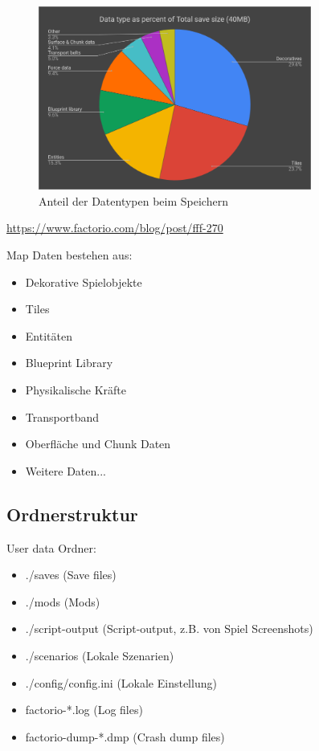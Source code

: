 \begin{figure}[htp]
    \centering
    \includegraphics[width=0.8\textwidth]{images/factorio_save_statistic.png}
    \caption{Anteil der Datentypen beim Speichern}
    \label{fig:factorioSaveStatistic}
\end{figure}
\url{https://www.factorio.com/blog/post/fff-270}

Map Daten bestehen aus:
\begin{itemize}
    \item Dekorative Spielobjekte 
    \item Tiles 
    \item Entitäten
    \item Blueprint Library
    \item Physikalische Kräfte
    \item Transportband
    \item Oberfläche und Chunk Daten
    \item Weitere Daten...
\end{itemize}

\subsection{Ordnerstruktur}
User data Ordner:
\begin{itemize}
    \item ./saves (Save files)
    \item ./mods (Mods)
    \item ./script-output (Script-output, z.B. von Spiel Screenshots)
    \item ./scenarios (Lokale Szenarien)
    \item ./config/config.ini (Lokale Einstellung)
    \item factorio-*.log (Log files)
    \item factorio-dump-*.dmp (Crash dump files)
\end{itemize}

